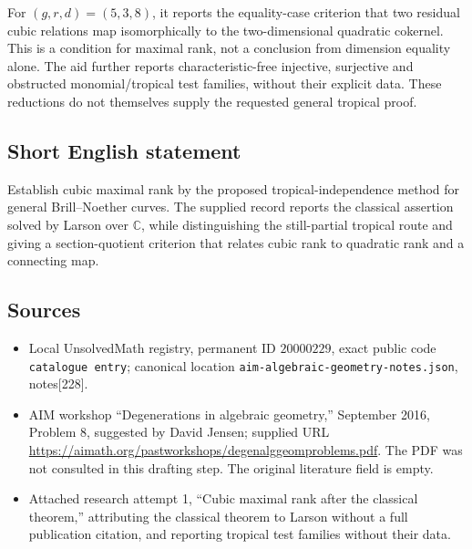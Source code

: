 \documentclass[11pt]{article}
\newcommand{\C}{\mathbb{C}}
\begin{document}
For \((g,r,d)=(5,3,8)\), it reports the equality-case criterion that two residual cubic relations map isomorphically to the two-dimensional quadratic cokernel. This is a condition for maximal rank, not a conclusion from dimension equality alone. The aid further reports characteristic-free injective, surjective and obstructed monomial/tropical test families, without their explicit data. These reductions do not themselves supply the requested general tropical proof.
\subsection{Short English statement}
Establish cubic maximal rank by the proposed tropical-independence method for general Brill--Noether curves. The supplied record reports the classical assertion solved by Larson over \(\C\), while distinguishing the still-partial tropical route and giving a section-quotient criterion that relates cubic rank to quadratic rank and a connecting map.
\subsection{Sources}
\begin{itemize}
\item Local UnsolvedMath registry, permanent ID \(20000229\), exact public code \texttt{catalogue entry}; canonical location \texttt{aim-algebraic-geometry-notes.json}, notes[228].
\item AIM workshop ``Degenerations in algebraic geometry,'' September 2016, Problem 8, suggested by David Jensen; supplied URL \url{https://aimath.org/pastworkshops/degenalggeomproblems.pdf}. The PDF was not consulted in this drafting step. The original literature field is empty.
\item Attached research attempt 1, ``Cubic maximal rank after the classical theorem,'' attributing the classical theorem to Larson without a full publication citation, and reporting tropical test families without their data.
\end{itemize}
\end{document}
